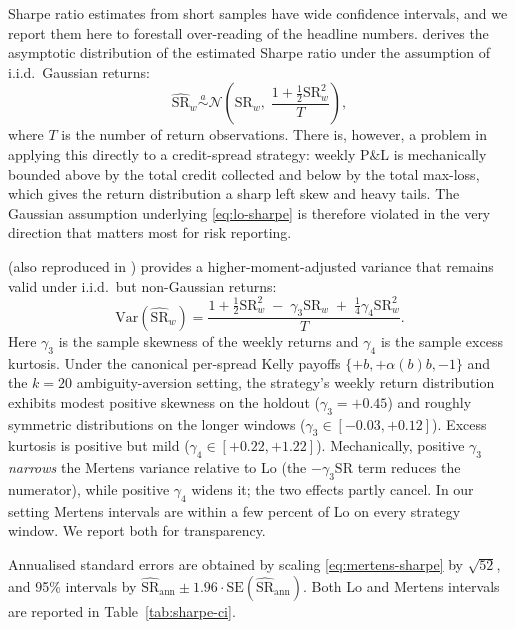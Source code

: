 \documentclass[11pt]{article}
\begin{document}
Sharpe ratio estimates from short samples have wide confidence intervals,
and we report them here to forestall over-reading of the headline
numbers. \citet{lo2002} derives the asymptotic distribution of the
estimated Sharpe ratio under the assumption of i.i.d.\ Gaussian returns:
\begin{equation}
\widehat{\mathrm{SR}}_w \overset{a}{\sim}
\mathcal{N}\!\left(\mathrm{SR}_w,\;
\frac{1 + \tfrac{1}{2}\mathrm{SR}_w^2}{T}\right),
\label{eq:lo-sharpe}
\end{equation}
where $T$ is the number of return observations. There is, however, a
problem in applying this directly to a credit-spread strategy: weekly
P\&L is mechanically bounded above by the total credit collected and
below by the total max-loss, which gives the return distribution a
sharp left skew and heavy tails. The Gaussian assumption underlying
\eqref{eq:lo-sharpe} is therefore violated in the very direction that
matters most for risk reporting.

\citet{mertens2002} (also reproduced in \citet{opdyke2007})
provides a higher-moment-adjusted variance that remains valid under
i.i.d.\ but non-Gaussian returns:
\begin{equation}
\mathrm{Var}(\widehat{\mathrm{SR}}_w)
  = \frac{1 + \tfrac{1}{2}\mathrm{SR}_w^2 \;-\; \gamma_3 \mathrm{SR}_w
            \;+\; \tfrac{1}{4}\gamma_4 \mathrm{SR}_w^2}{T}.
\label{eq:mertens-sharpe}
\end{equation}
Here $\gamma_3$ is the sample skewness of the weekly returns and
$\gamma_4$ is the sample excess kurtosis. Under the canonical
per-spread Kelly payoffs $\{+b, +\alpha(b) b, -1\}$ and the $k = 20$
ambiguity-aversion setting, the strategy's weekly return distribution
exhibits modest positive skewness on the holdout
($\gamma_3 = +0.45$) and roughly symmetric distributions on the longer
windows ($\gamma_3 \in [-0.03, +0.12]$). Excess kurtosis is positive
but mild ($\gamma_4 \in [+0.22, +1.22]$). Mechanically, positive
$\gamma_3$ \emph{narrows} the Mertens variance relative to Lo (the
$-\gamma_3 \mathrm{SR}$ term reduces the numerator), while positive
$\gamma_4$ widens it; the two effects partly cancel. In our setting
Mertens intervals are within a few percent of Lo on every strategy
window. We report both for transparency.

Annualised standard errors are obtained by scaling
\eqref{eq:mertens-sharpe} by $\sqrt{52}$, and 95\% intervals by
$\widehat{\mathrm{SR}}_{\mathrm{ann}} \pm 1.96 \cdot
\mathrm{SE}(\widehat{\mathrm{SR}}_{\mathrm{ann}})$. Both Lo and Mertens
intervals are reported in Table~\ref{tab:sharpe-ci}.
\end{document}
